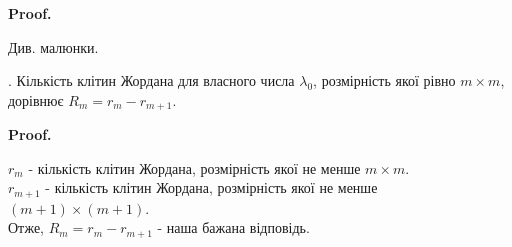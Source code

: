\documentclass[a4paper, 10pt]{article}
\makeatletter
\theoremstyle{theoremdd}
\renewenvironment{proof}[1][Proof.\\]{\par
\pushQED{\hfill \qed}%
\normalfont \topsep6\p@\@plus6\p@\relax
\trivlist
\item\relax
{\bfseries
#1\@addpunct{.}}\hspace\labelsep\ignorespaces
}{%
\popQED\endtrivlist\@endpefalse
}
\makeatother
\begin{document}
\begin{proof}
Див. малюнки.
\iffalse
Кількість клітин Жордана розміра не менше за $m \times m$ відповідає кількості ланцюгів висоти не менше $m$.\\
$\dim (\ker B^m)$ вміщує собі кількість ланцюгів висоти $1$, кількість ланцюгів висоти $2$, $\dots$, кількість ланцюгів висоти $m$.\\
$\dim (\ker B^{m-1})$ вміщує собі кількість ланцюгів висоти $1$, кількість ланцюгів висоти $2$, $\dots$, кількість ланцюгів висоти $m-1$.
\fi
\iffalse
Кількість клітин Жордана розміра не менше $1 \times 1$ відповідала кількість л.н.з. власних векторів -> приєднаний л.н.з висоти $m$.\\
Відповідно, кількість клітин Жордана розміра не менше $m \times m$ відповідає кількість приєднаних л.н.з. висоти $m-1$.\\
$\dim (\ker (A-\lambda_0 I)^m)$ відповідає за кількість л.н.з. приєднаних висоти $0$, приєднаних висоти $1$,\dots, приєднаних висоти $m-1$. Водночас $\dim (\ker (A-\lambda_0 I)^{m-1})$ відповідає за кількість л.н.з. приєднаних висоти $0$, приєднаних висоти $1$,\dots, приєднаних висоти $m-2$.\\
Звідси $r_m = \dim(\ker(A-\lambda_0 I)^m) - \dim(\ker(A-\lambda_0 I)^{m-1})$ - наша бажана відповідь.
\fi
\end{proof}
. Кількість клітин Жордана для власного числа $\lambda_0$, розмірність якої рівно $m \times m$, дорівнює $R_m = r_m - r_{m+1}$.

\begin{proof}
$r_m$ - кількість клітин Жордана, розмірність якої не менше $m \times m$.\\
$r_{m+1}$ - кількість клітин Жордана, розмірність якої не менше $(m+1) \times (m+1)$.\\
Отже, $R_m = r_m - r_{m+1}$ - наша бажана відповідь.
\end{proof}
\end{document}
